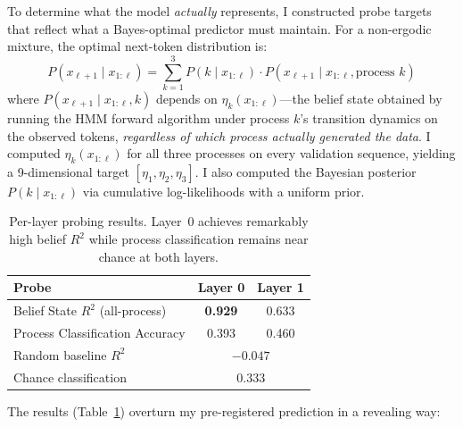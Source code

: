 \documentclass[11pt]{article}
\begin{document}
To determine what the model \emph{actually} represents, I constructed probe targets that reflect what a Bayes-optimal predictor must maintain. For a non-ergodic mixture, the optimal next-token distribution is:
\begin{equation}
    P(x_{\ell+1} \mid x_{1:\ell}) = \sum_{k=1}^{3} P(k \mid x_{1:\ell}) \cdot P(x_{\ell+1} \mid x_{1:\ell}, \text{process } k)
\end{equation}
where $P(x_{\ell+1} \mid x_{1:\ell}, k)$ depends on $\eta_k(x_{1:\ell})$---the belief state obtained by running the HMM forward algorithm under process $k$'s transition dynamics on the observed tokens, \emph{regardless of which process actually generated the data}. I computed $\eta_k(x_{1:\ell})$ for all three processes on every validation sequence, yielding a 9-dimensional target $[\eta_1, \eta_2, \eta_3]$. I also computed the Bayesian posterior $P(k \mid x_{1:\ell})$ via cumulative log-likelihoods with a uniform prior.

\begin{table}[h]
\centering
\begin{tabular}{lcc}
\toprule
\textbf{Probe} & \textbf{Layer 0} & \textbf{Layer 1} \\
\midrule
Belief State $R^2$ (all-process) & \textbf{0.929} & 0.633 \\
Process Classification Accuracy & 0.393 & 0.460 \\
\midrule
Random baseline $R^2$ & \multicolumn{2}{c}{$-0.047$} \\
Chance classification & \multicolumn{2}{c}{0.333} \\
\bottomrule
\end{tabular}
\caption{Per-layer probing results. Layer~0 achieves remarkably high belief $R^2$ while process classification remains near chance at both layers.}
\label{tab:probes}
\end{table}

The results (Table~\ref{tab:probes}) overturn my pre-registered prediction in a revealing way:
\end{document}
